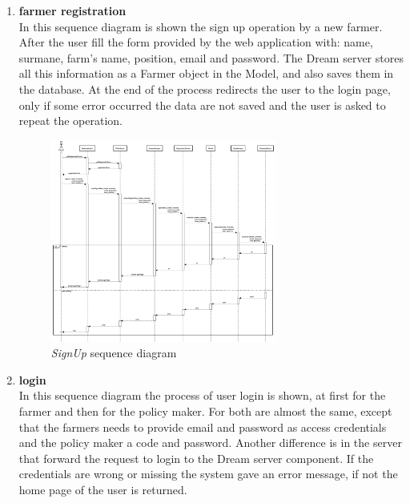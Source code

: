 \begin{enumerate}
    \item \textbf{farmer registration}\\
    In this sequence diagram is shown the sign up operation by a new farmer. After the user fill the form provided by the web application with: name, surmane, farm's name, position, email and password. The Dream server stores all this information as a Farmer object in the Model, and also saves them in the database. At the end of the process redirects the user to the login page, only if some error occurred the data are not saved and the user is asked to repeat the operation.
    \begin{figure}[H]
        \begin{center}
        \includegraphics[width=0.7\textwidth]{sequance/signup.png}
        \caption{\emph{SignUp} sequence diagram}
        \label{fig:sequence1}
        \end{center}
    \end{figure}
    \item \textbf{login}\\
    In this sequence diagram the process of user login is shown, at first for the farmer and then for the policy maker. For both are almost the same, except that the farmers needs to provide email and password as access credentials and the policy maker a code and password. Another difference is in the server that forward the request to login to the Dream server component. If the credentials are wrong or missing the system gave an error message, if not the home page of the user is returned.
    \begin{figure}[H]
        \begin{center}

\end{center}
\end{figure}
\end{enumerate}
